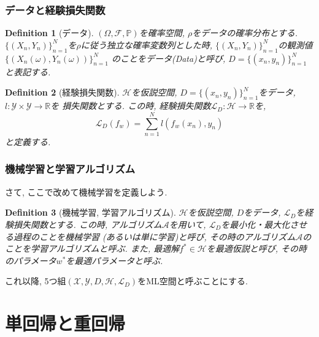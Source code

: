 \documentclass[dvipdfmx,11pt]{beamer}		%
\newtheorem{defi}{Definition}
\newcommand{\R}{\mathbb{R}}
\newcommand{\X}{\mathcal{X}}
\newcommand{\Y}{\mathcal{Y}}
\newcommand{\Hil}{\mathcal{H}}
\newcommand{\Loss}{\mathcal{L}_{D}}
\begin{document}
    \begin{frame}
        \frametitle{データと経験損失関数}
        \begin{defi}[データ]
            $(\Omega, \mathcal{F}, \mathbb{P})$を確率空間, $\rho$をデータの確率分布とする.
            $\{(X_n, Y_n)\}_{n = 1}^{N}$を$\rho$に従う独立な確率変数列とした時, $\{(X_n, Y_n)\}_{n = 1}^{N}$の観測値$\{(X_n(\omega), Y_n(\omega))\}_{n = 1}^{N}$
            のことをデータ(Data)と呼び, $D = \{(x_n, y_n)\}_{n = 1}^{N}$と表記する.
        \end{defi}
        \begin{defi}[経験損失関数]
            $\Hil$を仮説空間, $D = \{(x_n, y_n)\}_{n = 1}^{N}$をデータ, $l:\Y\times\Y\to\R$を
            損失関数とする. この時, 経験損失関数$\Loss:\Hil\to\R$を,
            \begin{equation*}
                \Loss(f_{w}) = \sum_{n = 1}^{N}l(f_{w}(x_n), y_n)
            \end{equation*}
            と定義する. 
        \end{defi}
    \end{frame}
    \begin{frame}
        \frametitle{機械学習と学習アルゴリズム}
        さて, ここで改めて機械学習を定義しよう.
        \begin{defi}[機械学習, 学習アルゴリズム]
            $\Hil$を仮説空間, $D$をデータ, $\Loss$を経験損失関数とする. この時, 
            アルゴリズム$\mathcal{A}$を用いて, $\Loss$を最小化・最大化させる過程のことを機械学習
            (あるいは単に学習)と呼び, その時のアルゴリズム$\mathcal{A}$のことを学習アルゴリズムと呼ぶ. 
            また, 最適解$f^{*}\in\Hil$を最適仮説と呼び, その時のパラメータ$w^{*}$を最適パラメータと呼ぶ. 
        \end{defi}
        これ以降, 5つ組$(\X, \Y, D, \Hil, \Loss)$をML空間と呼ぶことにする. 
    \end{frame}
    \section{単回帰と重回帰}
\end{document}
